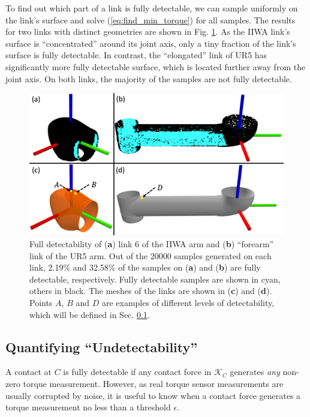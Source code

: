 To find out which part of a link is fully detectable, we can sample uniformly on the link's surface and solve (\ref{eq:find_min_torque}) for all samples. The results for two links with distinct geometries are shown in Fig. \ref{fig:full_observability}. As the IIWA link's surface is ``concentrated'' around its joint axis, only a tiny fraction of the link's surface is fully detectable. In contrast, the ``elongated'' link of UR5 has significantly more fully detectable surface, which is located further away from the joint axis. On both links, the majority of the samples are not fully detectable. 
\begin{figure}[h]
\vspace{-0.2cm}
\centering
\includegraphics[width=\linewidth]{figures/05_force_from_torque/full_observability.png}
\caption{Full detectability of (\textbf{a}) link 6 of the IIWA arm and (\textbf{b}) ``forearm'' link of the UR5 arm. Out of the 20000 samples generated on each link, 2.19\% and 32.58\% of the samples on (\textbf{a}) and (\textbf{b}) are fully detectable, respectively. Fully detectable samples are shown in cyan, others in black. The meshes of the links are shown in (\textbf{c}) and (\textbf{d}). Points $A$, $B$ and $D$ are examples of different levels of detectability, which will be defined in Sec. \ref{sec:undetectability}.}
\label{fig:full_observability}
\vspace{-0.5cm}
\end{figure}

\subsection{Quantifying ``Undetectability''} \label{sec:undetectability}
A contact at $C$ is fully detectable if any contact force in $\mathcal{K}_C$ generates \textit{any} non-zero torque measurement. However, as real torque sensor measurements are usually corrupted by noise, it is useful to know when a contact force generates a torque measurement no less than a threshold $\epsilon$.

